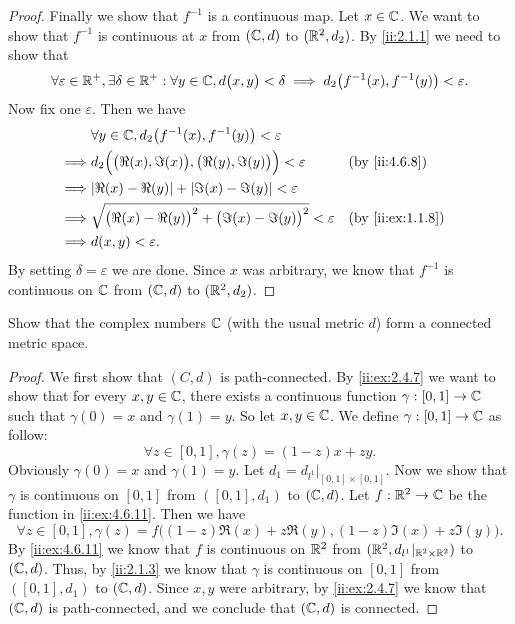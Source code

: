 \begin{proof}
  Finally we show that \(f^{-1}\) is a continuous map.
  Let \(x \in \mathbb{C}\).
  We want to show that \(f^{-1}\) is continuous at \(x\) from \((\mathbb{C}, d)\) to \((\mathbb{R}^2, d_2)\).
  By \cref{ii:2.1.1} we need to show that
  \[
    \forall \varepsilon \in \mathbb{R}^+, \exists \delta \in \mathbb{R}^+ : \forall y \in \mathbb{C}, d\big(x, y\big) < \delta \implies d_2\big(f^{-1}(x), f^{-1}(y)\big) < \varepsilon.
  \]
  Now fix one \(\varepsilon\).
  Then we have
  \begin{align*}
             & \forall y \in \C, d_2\big(f^{-1}(x), f^{-1}(y)\big) < \varepsilon                                    \\
    \implies & d_2\Big(\big(\Re(x), \Im(x)\big), \big(\Re(y), \Im(y)\big)\Big) < \varepsilon  &  & \by{ii:4.6.8}    \\
    \implies & \abs{\Re(x) - \Re(y)} + \abs{\Im(x) - \Im(y)} < \varepsilon                                          \\
    \implies & \sqrt{\big(\Re(x) - \Re(y)\big)^2 + \big(\Im(x) - \Im(y)\big)^2} < \varepsilon &  & \by{ii:ex:1.1.8} \\
    \implies & d(x, y) < \varepsilon.
  \end{align*}
  By setting \(\delta = \varepsilon\) we are done.
  Since \(x\) was arbitrary, we know that \(f^{-1}\) is continuous on \(\mathbb{C}\) from \((\mathbb{C}, d)\) to \((\mathbb{R}^2, d_2)\).
\end{proof}

\begin{ex}\label{ii:ex:4.6.12}
  Show that the complex numbers \(\mathbb{C}\) (with the usual metric \(d\)) form a connected metric space.
\end{ex}

\begin{proof}
  We first show that \((C, d)\) is path-connected.
  By \cref{ii:ex:2.4.7} we want to show that for every \(x, y \in \mathbb{C}\), there exists a continuous function \(\gamma : [0, 1] \to \mathbb{C}\) such that \(\gamma(0) = x\) and \(\gamma(1) = y\).
  So let \(x, y \in \mathbb{C}\).
  We define \(\gamma : [0, 1] \to \mathbb{C}\) as follow:
  \[
    \forall z \in [0, 1], \gamma(z) = (1 - z)x + zy.
  \]
  Obviously \(\gamma(0) = x\) and \(\gamma(1) = y\).
  Let \(d_1 = d_{l^1}|_{[0, 1] \times [0, 1]}\).
  Now we show that \(\gamma\) is continuous on \([0, 1]\) from \(([0, 1], d_1)\) to \((\mathbb{C}, d)\).
  Let \(f : \mathbb{R}^2 \to \mathbb{C}\) be the function in \cref{ii:ex:4.6.11}.
  Then we have
  \[
    \forall z \in [0, 1], \gamma(z) = f\big((1 - z) \Re(x) + z \Re(y), (1 - z) \Im(x) + z \Im(y)\big).
  \]
  By \cref{ii:ex:4.6.11} we know that \(f\) is continuous on \(\mathbb{R}^2\) from \((\mathbb{R}^2, d_{l^1}|_{\mathbb{R}^2 \times \mathbb{R}^2})\) to \((\mathbb{C}, d)\).
  Thus, by \cref{ii:2.1.3} we know that \(\gamma\) is continuous on \([0, 1]\) from \(([0, 1], d_1)\) to \((\mathbb{C}, d)\).
  Since \(x, y\) were arbitrary, by \cref{ii:ex:2.4.7} we know that \((\mathbb{C}, d)\) is path-connected, and we conclude that \((\mathbb{C}, d)\) is connected.
\end{proof}

